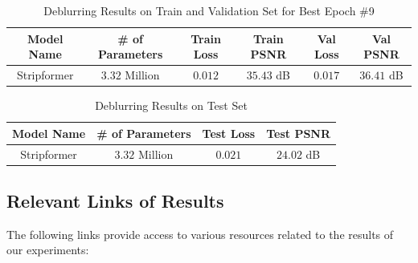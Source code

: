 \documentclass[12pt, a4paper, twoside]{article}
\begin{document}
			\begin{table}
				\begin{center}
					\begin{tabular}{c c c c c c}
						\hline
						\textbf{Model Name}& \textbf{\# of Parameters} & \textbf{Train Loss} & \textbf{Train PSNR} & \textbf{Val Loss} & \textbf{Val PSNR} \\ \hline
						Stripformer & $3.32$ Million & $0.012$ & $35.43$ dB & $0.017$ & $36.41$ dB \\ \hline
					\end{tabular}
					\caption{Deblurring Results on Train and Validation Set for Best Epoch \#9}\label{T:train}
				\end{center}
			\end{table}
			
			\begin{table}
				\begin{center}
						\begin{tabular}{c c c c}
								\hline
								\textbf{Model Name} & \textbf{\# of Parameters} & \textbf{Test Loss} & \textbf{Test PSNR} \\ \hline
								Stripformer & $3.32$ Million & $0.021$ & $24.02$ dB \\ \hline
							\end{tabular}
						\caption{Deblurring Results on Test Set}\label{T:test}
					\end{center}
			\end{table}
			
		\subsection{Relevant Links of Results}
			The following links provide access to various resources related to the results of our experiments:
			
\end{document}
